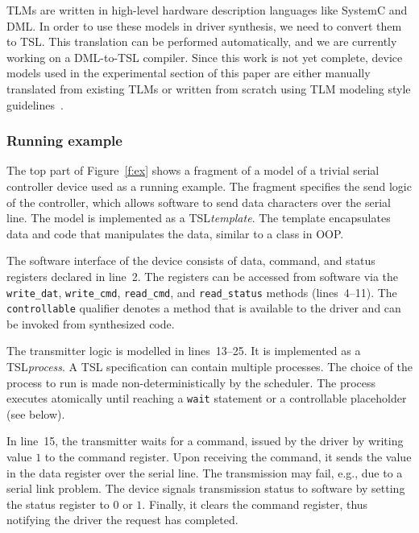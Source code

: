 \documentclass{book}
\newcommand{\tsl}{TSL\xspace}
\theoremstyle{definition}
\newcommand{\src}[1]{\texttt{\small #1}}
\begin{document}
TLMs are written in high-level hardware description languages like SystemC and DML.  In order to use these models in driver synthesis, we need to convert them to \tsl.  This translation can be performed automatically, and we are currently working on a DML-to-\tsl compiler.  Since this work is not yet complete, device models used in the experimental section of this paper are either manually translated from existing TLMs or written from scratch using TLM modeling style guidelines~\cite{dml_ug}.


\subsubsection{Running example}

The top part of Figure~\ref{f:ex} shows a fragment of a model of a trivial serial controller device used as a running example.  The fragment specifies the send logic of the controller, which allows software to send data characters over the serial line.  The model is implemented as a \tsl \emph{template}.  The template encapsulates data and code that manipulates the data, similar to a class in OOP.

The software interface of the device consists of data, command, and status registers declared in line~2.  The registers can be accessed from software via the \src{write\_dat}, \src{write\_cmd}, \src{read\_cmd}, and \src{read\_status} methods (lines~4--11).  The \src{controllable} qualifier denotes a method that is available to the driver and can be invoked from synthesized code.

The transmitter logic is modelled in lines~13--25.  It is implemented as a \tsl \emph{process}.  A \tsl specification can contain multiple processes.  The choice of the process to run is made non-deterministically by the scheduler.  The process executes atomically until reaching a \src{wait} statement or a controllable placeholder (see below).

In line~15, the transmitter waits for a command, issued by the driver by writing value $1$ to the command register.  Upon receiving the command, it sends the value in the data register over the serial line.  The transmission may fail, e.g., due to a serial link problem.  The device signals transmission status to software by setting the status register to $0$ or $1$.  Finally, it clears the command register, thus notifying the driver the request has completed.
\end{document}
